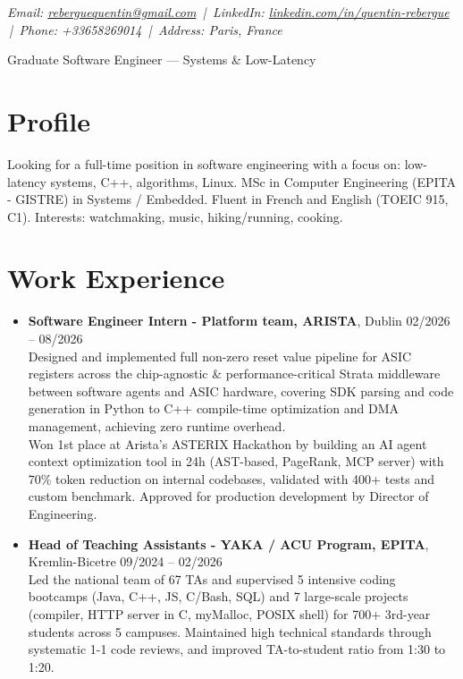 \documentclass[9pt,a4paper]{article}
\newcommand{\namefont}{\fontsize{18}{22}\selectfont}
\newcommand{\tinyscript}{\fontsize{8}{8}\selectfont}
\begin{document}
\renewcommand\normalsize{\fontsize{10.5}{15}\selectfont}
\normalsize

\begin{center}
  {\tinyscript\itshape
  Email: \href{mailto:reberguequentin@gmail.com}{reberguequentin@gmail.com} \,|\,
  LinkedIn: \href{https://linkedin.com/in/quentin-rebergue}{linkedin.com/in/quentin-rebergue} \,|\,
  Phone: +33658269014 \,|\,
  Address: Paris, France}
\end{center}

\begin{center}
  {\namefont Graduate Software Engineer — Systems \& Low-Latency}
\end{center}

\section*{Profile}
\begin{tcolorbox}[mybox2]
Looking for a full-time position in software engineering with a focus on: low-latency systems, C++, algorithms, Linux. MSc in Computer Engineering (EPITA - GISTRE) in Systems / Embedded. Fluent in French and English (TOEIC 915, C1). Interests: watchmaking, music, hiking/running, cooking.
\end{tcolorbox}

\section*{Work Experience}
\begin{tcolorbox}[mybox]
\begin{itemize}
\item\textbf{Software Engineer Intern - Platform team, ARISTA}, Dublin \hfill {\small02/2026 – 08/2026}\\[0.5em]
\textcolor{gray!40!black}{Designed and implemented full non-zero reset value pipeline for ASIC registers across the chip-agnostic \& performance-critical Strata middleware between software agents and ASIC hardware, covering SDK parsing and code generation in Python to C++ compile-time optimization and DMA management, achieving zero runtime overhead.\\
Won 1st place at Arista's ASTERIX Hackathon by building an AI agent context optimization tool in 24h (AST-based, PageRank, MCP server) with 70\% token reduction on internal codebases, validated with 400+ tests and custom benchmark. Approved for production development by Director of Engineering.}

\item\textbf{Head of Teaching Assistants - YAKA / ACU Program, EPITA}, Kremlin-Bicetre \hfill {\small09/2024 – 02/2026}\\[0.5em]
\textcolor{gray!40!black}{Led the national team of 67 TAs and supervised 5 intensive coding bootcamps (Java, C++, JS, C/Bash, SQL) and 7 large-scale projects (compiler, HTTP server in C, myMalloc, POSIX shell) for 700+ 3rd-year students across 5 campuses. Maintained high technical standards through systematic 1-1 code reviews, and improved TA-to-student ratio from 1:30 to 1:20.}
\end{itemize}
\end{tcolorbox}
\end{document}
